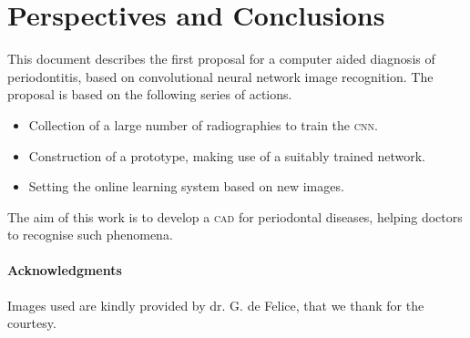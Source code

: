 \documentclass[a4paper, 10pt, superscriptaddress, nofootinbib, showkeys, notitlepage]{revtex4-1}
\begin{document}
\section{Perspectives and Conclusions}
	This document describes the first proposal for a computer aided diagnosis of periodontitis, based on convolutional neural network image recognition.
	The proposal is based on the following series of actions.
		\begin{itemize}
		\item[] Collection of a large number of radiographies to train the \textsc{cnn}.
		\item[] Construction of a prototype, making use of a suitably trained network.
		\item[] Setting the online learning system based on new images.
		\end{itemize}
	
	The aim of this work is to develop a \textsc{cad} for periodontal diseases, helping doctors to recognise such phenomena.
	
	\vskip 1cm
\paragraph*{Acknowledgments} 
	Images used are kindly provided by dr. G. de Felice, that we thank for the courtesy.
%	
%	
%
% 	


\nocite{*}
\end{document}
